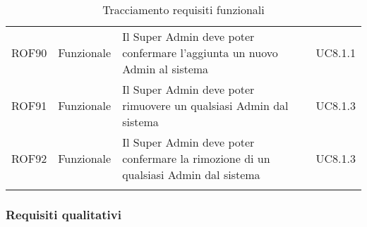 \documentclass[../AnalisiDeiRequisiti.tex]{subfiles}
\begin{document}
\begin{longtable}{p{2.5cm}!{\VRule[1pt]}p{2.5cm}!{\VRule[1pt]}p{5cm}!{\VRule[1pt]}p{2.5cm}}
	ROF90&Funzionale\newline  & Il Super Admin deve poter confermare l'aggiunta un nuovo Admin al sistema & UC8.1.1 \\
	ROF91&Funzionale\newline  & Il Super Admin deve poter rimuovere un qualsiasi Admin dal sistema & UC8.1.3 \\
	ROF92&Funzionale\newline  & Il Super Admin deve poter confermare la rimozione di un qualsiasi Admin dal sistema & UC8.1.3 \\
	\caption{Tracciamento requisiti funzionali}
	\end{longtable}

	\newpage
	\subsubsection{Requisiti qualitativi}
	\def\arraystretch{1.5}
\end{document}
